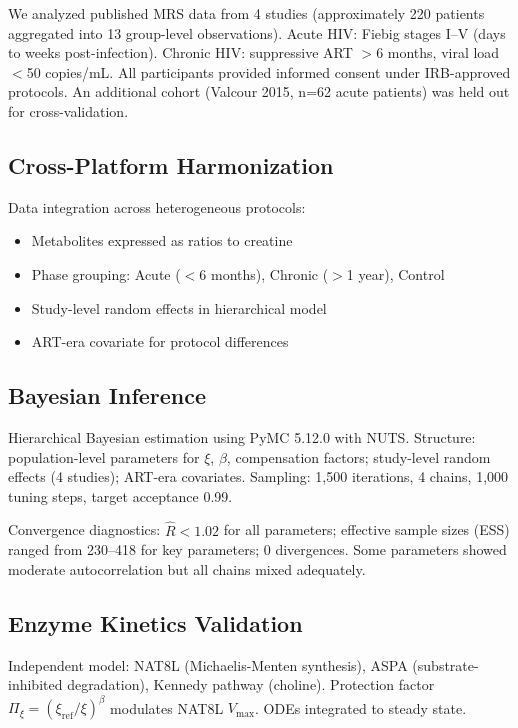 \documentclass[10pt,a4paper]{article}
\begin{document}
We analyzed published MRS data from 4 studies (approximately 220 patients aggregated into 13 group-level observations). Acute HIV: Fiebig stages I--V (days to weeks post-infection). Chronic HIV: suppressive ART $>$6 months, viral load $<$50 copies/mL. All participants provided informed consent under IRB-approved protocols\cite{sailasuta2012,young2014,valcour2012}. An additional cohort (Valcour 2015, n=62 acute patients) was held out for cross-validation.

\subsection{Cross-Platform Harmonization}

Data integration across heterogeneous protocols:
\begin{itemize}
\item Metabolites expressed as ratios to creatine
\item Phase grouping: Acute ($<$6 months), Chronic ($>$1 year), Control
\item Study-level random effects in hierarchical model
\item ART-era covariate for protocol differences
\end{itemize}

\subsection{Bayesian Inference}

Hierarchical Bayesian estimation using PyMC 5.12.0\cite{abril2023} with NUTS\cite{hoffman2014}. Structure: population-level parameters for $\xi$, $\beta$, compensation factors; study-level random effects (4 studies); ART-era covariates. Sampling: 1,500 iterations, 4 chains, 1,000 tuning steps, target acceptance 0.99.

Convergence diagnostics: $\hat{R} < 1.02$ for all parameters; effective sample sizes (ESS) ranged from 230--418 for key parameters; 0 divergences. Some parameters showed moderate autocorrelation but all chains mixed adequately.

\subsection{Enzyme Kinetics Validation}

Independent model: NAT8L (Michaelis-Menten synthesis), ASPA (substrate-inhibited degradation), Kennedy pathway (choline). Protection factor $\Pi_\xi = (\xi_{\text{ref}}/\xi)^\beta$ modulates NAT8L $V_{\text{max}}$. ODEs integrated to steady state.
\end{document}
